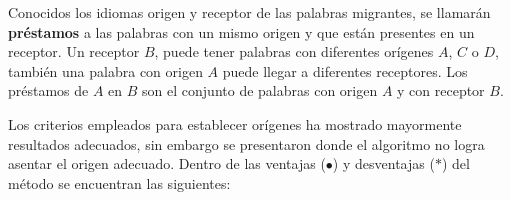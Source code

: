 Conocidos los idiomas origen y receptor de las palabras migrantes, se llamarán
\textbf{préstamos} a las palabras con un mismo origen y que están  presentes en
un receptor.  Un receptor $\textit{B}$, puede tener palabras con diferentes
orígenes $\textit{A}$, $\textit{C}$ o $\textit{D}$, también una palabra con
origen $\textit{A}$ puede llegar a diferentes receptores.  Los préstamos de
$\textit{A}$  en $\textit{B}$  son el conjunto de palabras con origen
$\textit{A}$  y con receptor $\textit{B}$.     






Los criterios empleados para establecer orígenes ha mostrado mayormente resultados adecuados, sin embargo se presentaron donde el algoritmo no logra asentar el origen adecuado. Dentro de las ventajas ($\bullet$) y desventajas ($\ast$) del método se encuentran las siguientes:

